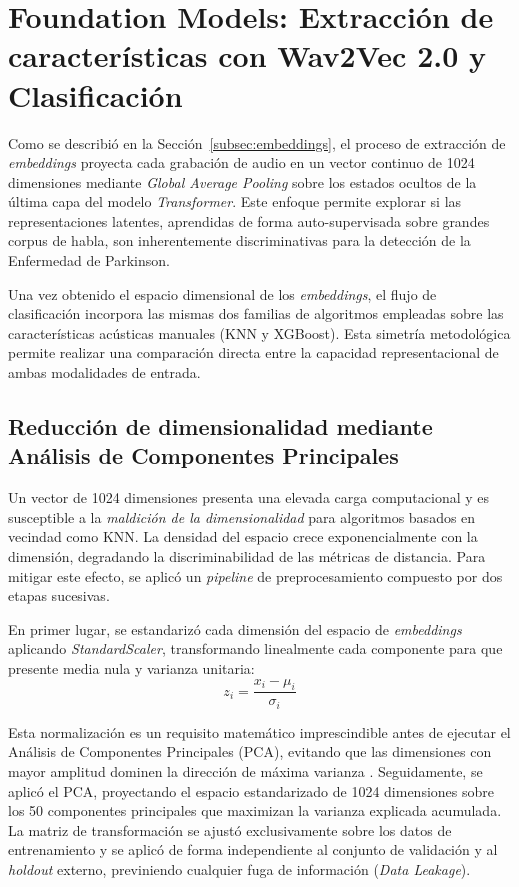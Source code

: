\section{Foundation Models: Extracción de características con Wav2Vec 2.0 y Clasificación}\label{sec:foundational_models}

Como se describió en la Sección~\ref{subsec:embeddings}, el proceso de extracción de \textit{embeddings} proyecta cada grabación de audio en un vector continuo de 1024 dimensiones mediante \textit{Global Average Pooling} sobre los estados ocultos de la última capa del modelo \textit{Transformer}. Este enfoque permite explorar si las representaciones latentes, aprendidas de forma auto-supervisada sobre grandes corpus de habla, son inherentemente discriminativas para la detección de la Enfermedad de Parkinson.

Una vez obtenido el espacio dimensional de los \textit{embeddings}, el flujo de clasificación incorpora las mismas dos familias de algoritmos empleadas sobre las características acústicas manuales (KNN y XGBoost). Esta simetría metodológica permite realizar una comparación directa entre la capacidad representacional de ambas modalidades de entrada.

\subsection{Reducción de dimensionalidad mediante Análisis de Componentes Principales}

Un vector de 1024 dimensiones presenta una elevada carga computacional y es susceptible a la \textit{maldición de la dimensionalidad} para algoritmos basados en vecindad como KNN. La densidad del espacio crece exponencialmente con la dimensión, degradando la discriminabilidad de las métricas de distancia. Para mitigar este efecto, se aplicó un \textit{pipeline} de preprocesamiento compuesto por dos etapas sucesivas.

En primer lugar, se estandarizó cada dimensión del espacio de \textit{embeddings} aplicando \textit{StandardScaler}, transformando linealmente cada componente para que presente media nula y varianza unitaria:
\[
    z_i = \frac{x_i - \mu_i}{\sigma_i}
\]

Esta normalización es un requisito matemático imprescindible antes de ejecutar el Análisis de Componentes Principales (PCA), evitando que las dimensiones con mayor amplitud dominen la dirección de máxima varianza \cite{pedregosa2012}. Seguidamente, se aplicó el PCA, proyectando el espacio estandarizado de 1024 dimensiones sobre los 50 componentes principales que maximizan la varianza explicada acumulada. La matriz de transformación se ajustó exclusivamente sobre los datos de entrenamiento y se aplicó de forma independiente al conjunto de validación y al \textit{holdout} externo, previniendo cualquier fuga de información (\textit{Data Leakage}).


